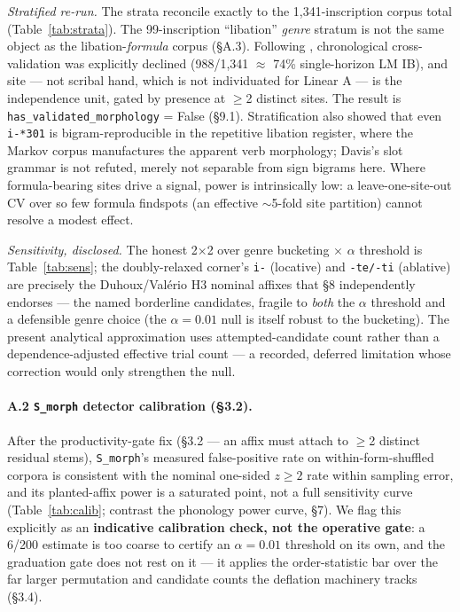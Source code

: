 \emph{Stratified re-run.} The strata reconcile exactly to the
1,341-inscription corpus total (Table~\ref{tab:strata}). The
99-inscription ``libation'' \emph{genre} stratum is not the same object
as the libation-\emph{formula} corpus (\S A.3). Following
\citet{salgarellajudson2024}, chronological cross-validation was explicitly
declined (988/1,341 $\approx$ 74\% single-horizon LM IB), and site --- not
scribal hand, which is not individuated for Linear A
\citep{salgarella2019} --- is the independence unit, gated by presence at
$\ge$2 distinct sites. The result is \texttt{has\_validated\_morphology} =
False (\S9.1). Stratification also showed
that even \texttt{i-*301} is bigram-reproducible in the repetitive libation
register, where the Markov corpus manufactures the apparent verb
morphology; Davis's slot grammar is not refuted, merely not separable from
sign bigrams here. Where formula-bearing sites drive a signal, power is
intrinsically low: a leave-one-site-out CV over so few formula findspots
(an effective $\sim$5-fold site partition) cannot resolve a modest effect.

\emph{Sensitivity, disclosed.} The honest 2$\times$2 over genre bucketing
$\times$ $\alpha$ threshold is Table~\ref{tab:sens}; the doubly-relaxed
corner's \texttt{i-} (locative) and \texttt{-te/-ti} (ablative) are
precisely the Duhoux/Val\'{e}rio H3 nominal affixes that
\citet{salgarella2025} \S8 independently endorses --- the named borderline
candidates, fragile to \emph{both} the $\alpha$ threshold and a defensible
genre choice (the $\alpha = 0.01$ null is itself robust to the bucketing).
The present analytical approximation uses attempted-candidate
count rather than a dependence-adjusted effective trial count --- a
recorded, deferred limitation whose correction would only strengthen the
null.

\paragraph{A.2 \texttt{S\_morph} detector calibration (\S3.2).} After the productivity-gate fix (\S3.2 --- an affix must attach to
$\ge$2 distinct residual stems), \texttt{S\_morph}'s measured false-positive
rate on within-form-shuffled corpora is consistent with the nominal
one-sided $z \ge 2$ rate within sampling error, and its planted-affix
power is a saturated point, not a full sensitivity curve
(Table~\ref{tab:calib}; contrast the phonology power curve, \S7). We flag
this explicitly as an \textbf{indicative calibration check, not the
operative gate}: a 6/200 estimate is too coarse to certify an $\alpha =
0.01$ threshold on its own, and the graduation gate does not rest on it
--- it applies the order-statistic bar over the far larger permutation
and candidate counts the deflation machinery tracks (\S3.4).

